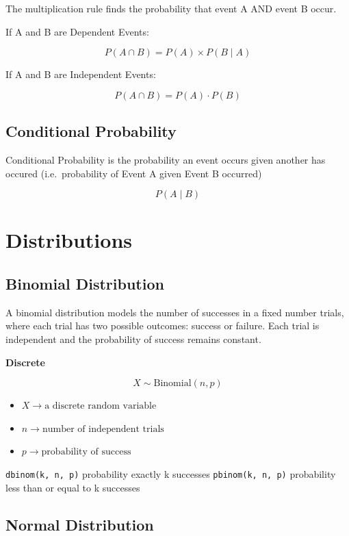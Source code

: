 \documentclass[
  letterpaper,
  DIV=11,
  numbers=noendperiod]{scrreprt}
\providecommand{\tightlist}{%
  \setlength{\itemsep}{0pt}\setlength{\parskip}{0pt}}
\begin{document}
The multiplication rule finds the probability that event A AND event B
occur.

If A and B are Dependent Events:

\[P(A\cap B)=P(A)\times P(B\mid A)\]

If A and B are Independent Events:

\[P(A\cap B)=P(A)\cdot P(B)\]

\subsection{Conditional Probability}\label{conditional-probability}

Conditional Probability is the probability an event occurs given another
has occured (i.e.~probability of Event A given Event B occurred)

\[P(A\mid B)\]

\section{Distributions}\label{distributions}

\subsection{Binomial Distribution}\label{binomial-distribution}

A binomial distribution models the number of successes in a fixed number
trials, where each trial has two possible outcomes: success or failure.
Each trial is independent and the probability of success remains
constant.

\textbf{Discrete}

\[X\sim\text{Binomial}(n,p)\]

\begin{itemize}
\tightlist
\item
  \(X \rightarrow \text{a discrete random variable}\)
\item
  \(n \rightarrow \text{number of independent trials}\)
\item
  \(p \rightarrow \text{probability of success}\)
\end{itemize}

\texttt{dbinom(k,\ n,\ p)} probability exactly k successes
\texttt{pbinom(k,\ n,\ p)} probability less than or equal to k successes

\subsection{Normal Distribution}\label{normal-distribution}
\end{document}
